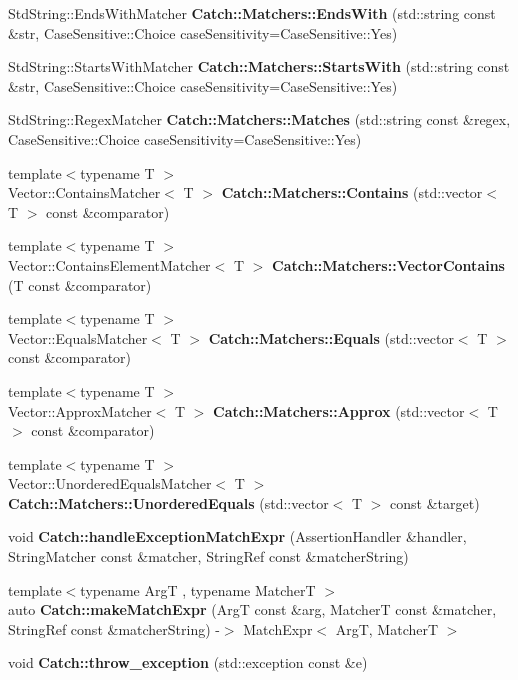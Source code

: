 \begin{DoxyCompactItemize}
\item 
Std\+String\+::\+Ends\+With\+Matcher \textbf{ Catch\+::\+Matchers\+::\+Ends\+With} (std\+::string const \&str, Case\+Sensitive\+::\+Choice case\+Sensitivity=Case\+Sensitive\+::\+Yes)
\item 
Std\+String\+::\+Starts\+With\+Matcher \textbf{ Catch\+::\+Matchers\+::\+Starts\+With} (std\+::string const \&str, Case\+Sensitive\+::\+Choice case\+Sensitivity=Case\+Sensitive\+::\+Yes)
\item 
Std\+String\+::\+Regex\+Matcher \textbf{ Catch\+::\+Matchers\+::\+Matches} (std\+::string const \&regex, Case\+Sensitive\+::\+Choice case\+Sensitivity=Case\+Sensitive\+::\+Yes)
\item 
{\footnotesize template$<$typename T $>$ }\\Vector\+::\+Contains\+Matcher$<$ T $>$ \textbf{ Catch\+::\+Matchers\+::\+Contains} (std\+::vector$<$ T $>$ const \&comparator)
\item 
{\footnotesize template$<$typename T $>$ }\\Vector\+::\+Contains\+Element\+Matcher$<$ T $>$ \textbf{ Catch\+::\+Matchers\+::\+Vector\+Contains} (T const \&comparator)
\item 
{\footnotesize template$<$typename T $>$ }\\Vector\+::\+Equals\+Matcher$<$ T $>$ \textbf{ Catch\+::\+Matchers\+::\+Equals} (std\+::vector$<$ T $>$ const \&comparator)
\item 
{\footnotesize template$<$typename T $>$ }\\Vector\+::\+Approx\+Matcher$<$ T $>$ \textbf{ Catch\+::\+Matchers\+::\+Approx} (std\+::vector$<$ T $>$ const \&comparator)
\item 
{\footnotesize template$<$typename T $>$ }\\Vector\+::\+Unordered\+Equals\+Matcher$<$ T $>$ \textbf{ Catch\+::\+Matchers\+::\+Unordered\+Equals} (std\+::vector$<$ T $>$ const \&target)
\item 
void \textbf{ Catch\+::handle\+Exception\+Match\+Expr} (Assertion\+Handler \&handler, String\+Matcher const \&matcher, String\+Ref const \&matcher\+String)
\item 
{\footnotesize template$<$typename ArgT , typename MatcherT $>$ }\\auto \textbf{ Catch\+::make\+Match\+Expr} (ArgT const \&arg, MatcherT const \&matcher, String\+Ref const \&matcher\+String) -\/$>$ Match\+Expr$<$ ArgT, MatcherT $>$
\item 
void \textbf{ Catch\+::throw\+\_\+exception} (std\+::exception const \&e)

\end{DoxyCompactItemize}

